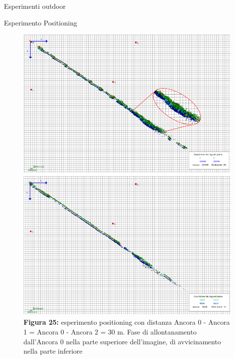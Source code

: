 \documentclass[12pt]{report}
\begin{document}
\begin{section}{Esperimenti outdoor}
\begin{subsection}{Esperimento Positioning}
			\begin{figure}[H]
				\centering
				\includegraphics[scale=0.2]{EspOutPos2}
	 			\caption{\textbf{Figura 25:} esperimento positioning con distanza Ancora 0 - Ancora 1 = Ancora 0 - Ancora 2 = 30 m. Fase di allontanamento dall'Ancora 0 nella parte superiore dell'imagine, di avvicinamento nella parte inferiore\label{EspOutPos2}}
			\end{figure}


\end{subsection}
\end{section}
\end{document}
